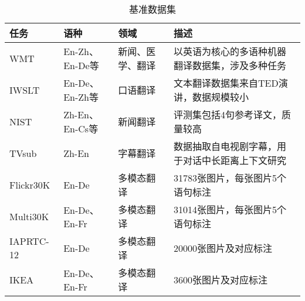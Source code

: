 \begin{appendices}
\begin{table}[htp]{
\footnotesize
\begin{center}
\caption{基准数据集}
\label{tab:Reference-data-set}
\begin{tabular}{p{1.6cm} | p{1.3cm} p{1.6cm} p{5.2cm}}
{任务} & {语种} &{领域} &{描述} \\
\hline
\rule{0pt}{15pt}WMT & En-Zh、En-De等& 新闻、医学、翻译 & 以英语为核心的多语种机器翻译数据集，涉及多种任务\\
\rule{0pt}{15pt}IWSLT & En-De、En-Zh等 & 口语翻译 & 文本翻译数据集来自TED演讲，数据规模较小\\
\rule{0pt}{15pt}NIST & Zh-En、En-Cs等 & 新闻翻译 & 评测集包括4句参考译文，质量较高\\
\rule{0pt}{15pt}TVsub & Zh-En & 字幕翻译 & 数据抽取自电视剧字幕，用于对话中长距离上下文研究\\
\rule{0pt}{15pt}Flickr30K & En-De & 多模态翻译 & 31783张图片，每张图片5个语句标注 \\
\rule{0pt}{15pt}Multi30K  & En-De、En-Fr & 多模态翻译 & 31014张图片，每张图片5个语句标注  \\
\rule{0pt}{15pt}IAPRTC-12 & En-De & 多模态翻译 & 20000张图片及对应标注  \\
\rule{0pt}{15pt}IKEA & En-De、En-Fr & 多模态翻译 & 3600张图片及对应标注   \\
\end{tabular}
\end{center}
}\end{table}




\end{appendices}
